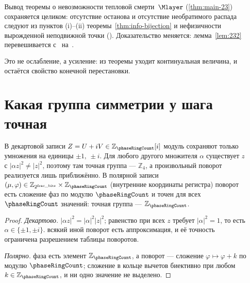 \begin{corollary}
\label{cor:heat-death-without-norm}
Вывод теоремы о невозможности тепловой смерти~$\Mlayer$ (\cref{thm:main-23})
сохраняется целиком: отсутствие останова и отсутствие необратимого распада
следуют из пунктов (i)--(ii) теоремы~\ref{thm:info-bijection}
и нефизичности вырожденной неподвижной точки ().
Доказательство меняется: лемма~\ref{lem:232} перевешивается с~
на~.
\end{corollary}

Это не ослабление, а усиление: из теоремы уходит континуальная величина,
и остаётся свойство конечной перестановки.

\section{Какая группа симметрии у шага точная}

\begin{proposition}
\label{prop:z4-exact}
В декартовой записи $Z=U+iV\in\mathbb{Z}_{\phaseRingCount}[i]$ модуль сохраняют только
умножения на единицы $\pm1,\ \pm i$. Для любого другого множителя $\alpha$
существует $z$ с $|\alpha z|^2\ne|z|^2$, поэтому там точная группа --- $\mathbb{Z}_4$,
а произвольный поворот реализуется лишь приближённо.
В полярной записи $(\mu,\varphi)\in\mathbb{Z}_{2^{\mathrm{frac\_bits}}}\times\mathbb{Z}_{\phaseRingCount}$
(внутренние координаты регистра) поворот есть сложение фаз по модулю $\phaseRingCount$
и точен для всех $\phaseRingCount$ значений: точная группа --- $\mathbb{Z}_{\phaseRingCount}$.
\end{proposition}

\begin{proof}
\emph{Декартово.}
$|\alpha z|^2=|\alpha|^2|z|^2$; равенство при всех $z$ требует $|\alpha|^2=1$,
то есть $\alpha\in\{\pm1,\pm i\}$.
\pfollows
всякий иной поворот есть аппроксимация, и её точность ограничена разрешением
таблицы поворотов.

\emph{Полярно.}
фаза есть элемент $\mathbb{Z}_{\phaseRingCount}$, а поворот --- сложение
$\varphi\mapsto\varphi+k$ по модулю $\phaseRingCount$; сложение в кольце вычетов
биективно при любом $k\in\mathbb{Z}_{\phaseRingCount}$, и ни одно значение не выделено.
\end{proof}

